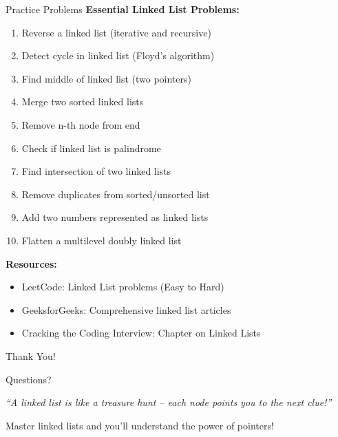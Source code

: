 \documentclass[aspectratio=169,xcolor=dvipsnames]{beamer}
\begin{document}
\begin{frame}{Practice Problems}
  \textbf{Essential Linked List Problems:}
  \begin{enumerate}
    \item Reverse a linked list (iterative and recursive)
    \item Detect cycle in linked list (Floyd's algorithm)
    \item Find middle of linked list (two pointers)
    \item Merge two sorted linked lists
    \item Remove n-th node from end
    \item Check if linked list is palindrome
    \item Find intersection of two linked lists
    \item Remove duplicates from sorted/unsorted list
    \item Add two numbers represented as linked lists
    \item Flatten a multilevel doubly linked list
  \end{enumerate}

  \vspace{0.3cm}
  \textbf{Resources:}
  \begin{itemize}
    \item LeetCode: Linked List problems (Easy to Hard)
    \item GeeksforGeeks: Comprehensive linked list articles
    \item Cracking the Coding Interview: Chapter on Linked Lists
  \end{itemize}
\end{frame}

\begin{frame}
  \begin{center}
    {\Huge Thank You!}

    \vspace{1cm}
    {\Large Questions?}

    \vspace{1cm}
    \textit{``A linked list is like a treasure hunt -- each node points you to the next clue!''}

    \vspace{0.5cm}
    \small Master linked lists and you'll understand the power of pointers!
  \end{center}
\end{frame}
\end{document}
